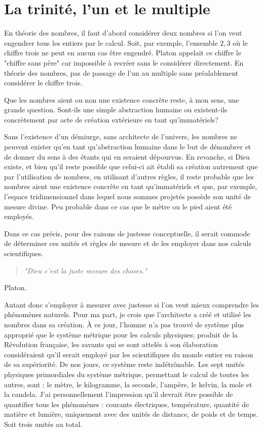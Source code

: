\chapter{La trinité, l'un et le multiple}

En théorie des nombres, il faut d'abord considérer deux nombres si l'on veut engendrer tous les entiers par le calcul. Soit, par exemple, l'ensemble ${2,3}$ où le chiffre trois ne peut en aucun cas être engendré. Platon appelait ce chiffre le "chiffre sans père" car impossible à recréer sans le considérer directement. En théorie des nombres, pas de passage de l'un au multiple sans préalablement considérer le chiffre trois.

Que les nombres aient ou non une existence concrète reste, à mon sens, une grande question. Sont-ils une simple abstraction humaine ou existent-ils concrètement par acte de création extérieure en tant qu'immatériels?

Sans l’existence d'un démiurge, sans architecte de l'univers, les nombres ne peuvent exister qu'en tant qu'abstraction humaine dans le but de dénombrer et de donner du sens à des étants qui en seraient dépourvus. En revanche, si Dieu existe, et bien qu'il reste possible que celui-ci ait établi sa création autrement que par l'utilisation de nombres, en utilisant d'autres règles, il reste probable que les nombres aient une existence concrète en tant qu'immatériels et que, par exemple, l'espace tridimensionnel dans lequel nous sommes projetés possède son unité de mesure divine. Peu probable dans ce cas que le mètre ou le pied aient été employés.

Dans ce cas précis, pour des raisons de justesse conceptuelle, il serait commode de déterminer ces unités et règles de mesure et de les employer dans nos calculs scientifiques.

\begin{center}
\begin{quote}
\textit{"Dieu c'est la juste mesure des choses."}
\end{quote} Platon.
\end{center}

Autant donc s'employer à mesurer avec justesse si l'on veut mieux comprendre les phénomènes naturels. Pour ma part, je crois que l'architecte a créé et utilisé les nombres dans sa création. À ce jour, l'homme n'a pas trouvé de système plus approprié que le système métrique pour les calculs physiques; produit de la Révolution française, les savants qui se sont attelés à son élaboration considéraient qu'il serait employé par les scientifiques du monde entier en raison de sa supériorité. De nos jours, ce système reste indétrônable. Les sept unités physiques primordiales du système métrique, permettant le calcul de toutes les autres, sont : le mètre, le kilogramme, la seconde, l'ampère, le kelvin, la mole et la candela. J'ai personnellement l’impression qu'il devrait être possible de quantifier tous les phénomènes : courants électriques, température, quantité de matière et lumière, uniquement avec des unités de distance, de poids et de temps. Soit trois unités au total.



